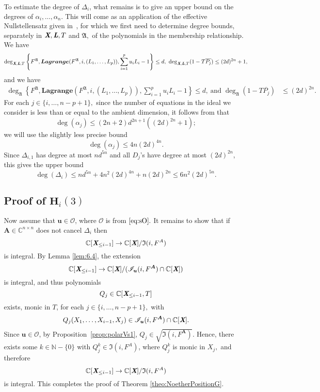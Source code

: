 \documentclass[12pt]{article}
\def\sO{\mathscr{O}}
\def\A{\mathfrak{A}}
\def\Lb{\textit{\textbf{L}}}
\def\Xb{\textit{\textbf{X}}}
\def\mA{{\bm A}}
\def\ub{{\bm u}}
\def\pjb{\overline{P_{j}}}
\def\D{\Delta}
\def\C{\mathbb{C}}
\def\IiA{\mathfrak{I}(i,F^A)}
\def\IiAr{\sqrt{\mathfrak{I}(i,F^{\mA})}}
\def\lagFfA{{\bm{Lagrange}}(F^{\A},i,(L_1,\hdots,L_p))}
\def\IilA{\mathscr{I}_{\ub}(i,F^{\mA})}
\def\udl{\sum_{i=1}^pu_iL_i}
\begin{document}
\noindent
To estimate the degree of $\D_{i}$, what remains is to give an upper
bound on the degrees of $\alpha_i,\dots,\alpha_n$. This will come as an
application of the effective Nullstellensatz given in~\cite{EN}, for
which we first need to determine degree bounds, separately in $\Xb,\Lb,T$
and $\A,$ of the polynomials in the membership relationship. We have
\begin{align*}
\deg_{\Xb,\Lb,T}
\left\{ 
F^{\A},\lagFfA, \udl-1
\right\}
\leq d, ~
\deg_{\Xb,\Lb,T}(1-T\pjb) \leq (2d)^{2n} +1, 
\end{align*}
and we have 
\begin{align*}
\deg_{\A}  
\left\{ 
F^{\A},\lagFfA, \udl-1
\right\} 
\leq d,~\textrm{and }
\deg_{\A}(1-T\pjb)& \leq (2d)^{2n}.
\end{align*}
For each $j \in \{i,\hdots,n-p+1\},$ since  the number of equations in the ideal we consider is less than or equal to the ambient dimension, it follows from \cite[Theorem 0.5]{EN} that  
\[
\deg(\alpha_j) \le (2n+2)d^{2n+1}((2d)^{2n}+1);
\]
we will use
the slightly less precise bound \[\deg(\alpha_j) \le 4n(2d)^{4n}.\] Since $\D_{i,1}$ has degree at most
$nd^{5n}$ and all $D_j$'s have degree at most $(2d)^{2n}$, this gives
the upper bound
$$\deg(\D_i) \le nd^{5n} +  4n^2(2d)^{4n} + n(2d)^{2n} \leq 6n^2(2d)^{5n}.$$



\subsection{Proof of $\textbf{H}_i(3)$}

Now assume that $\ub \in \mathscr{O}$, where $\sO$ is from
$\eqref{eq:sO}.$ It remains to show that if $\mA \in \C^{n\times n}$
does not cancel $\D_{i}$ then
\[
 \C[\Xb_{\leq i-1}]\rightarrow \C[\Xb]/\IiA
\]
is integral. 
\noindent
By Lemma \ref{lem:6.4}, the extension
\[
 \C[\Xb_{\leq i-1}]\rightarrow \C[\Xb]/(\IilA \cap \C[\Xb])
\]
is integral, and thus polynomials 
\[
Q_j \in \C[\Xb_{\leq i-1},T]
\]
exists, monic in $T$, for each $j \in \{i,\hdots,n-p+1\},$ with
\begin{align*}
Q_j(X_1,\hdots,X_{i-1},X_j) \in \IilA \cap \C[\Xb].
\end{align*}
%
Since $\ub \in \sO$, by Proposition~\ref{prop:polarVs1}, $Q_j \in \IiAr.$ Hence, there exists some $k \in \mathbb{N}-\{0\}$ with $Q_j^{k} \in\IiA$, where $Q_j^k$ is monic in $X_j,$ and therefore
\[
 \C[\Xb_{\leq i-1}]\rightarrow \C[\Xb]/\IiA
\]
is integral. This completes the proof of Theorem \ref{theo:NoetherPositionG}.
\end{document}
